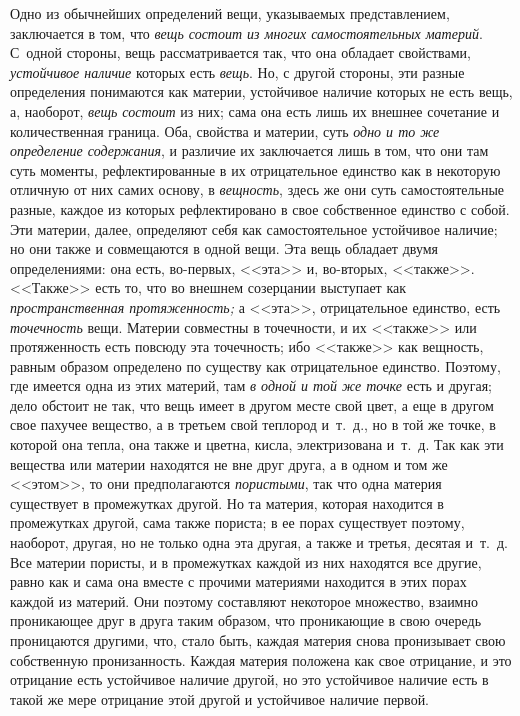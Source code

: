 Одно из обычнейших определений вещи, указываемых представлением, заключается
в том, что {\em вещь состоит из многих самостоятельных
материй}. С~одной стороны, вещь рассматривается так, что она обладает
свойствами, {\em устойчивое наличие} которых есть
{\em вещь}. Но, с другой стороны, эти разные
определения понимаются как материи, устойчивое наличие которых не есть
вещь, а, наоборот, {\em вещь состоит} из них; сама она
есть лишь их внешнее сочетание и количественная граница. Оба, свойства и
материи, суть {\em одно и то же определение
содержания}, и различие их заключается лишь в том, что они там суть
моменты, рефлектированные в их отрицательное единство как в некоторую
отличную от них самих основу, в {\em вещность}, здесь
же они суть самостоятельные разные, каждое из которых рефлектировано в свое
собственное единство с собой. Эти материи, далее, определяют себя как
самостоятельное устойчивое наличие; но они также и совмещаются в одной
вещи. Эта вещь обладает двумя определениями: она есть, во-первых, <<эта>> и,
во-вторых, <<также>>. <<Также>> есть то, что во внешнем созерцании выступает
как {\em пространственная протяженность;} а <<эта>>,
отрицательное единство, есть {\em точечность} вещи.
Материи совместны в точечности, и их <<также>> или протяженность есть повсюду
эта точечность; ибо <<также>> как вещность, равным образом определено по
существу как отрицательное единство. Поэтому, где имеется одна из этих
материй, там {\em в одной и той же точке} есть и
другая; дело обстоит не так, что вещь имеет в другом месте свой цвет, а еще
в другом свое пахучее вещество, а в третьем свой теплород и~т.~д., но в той
же точке, в которой она тепла, она также и цветна, кисла, электризована
и~т.~д. Так как эти вещества или материи находятся не вне друг друга, а в
одном и том же <<этом>>, то они предполагаются
{\em пористыми}, так что одна материя существует в
промежутках другой. Но та материя, которая находится в промежутках другой,
сама также пориста; в ее порах существует поэтому, наоборот, другая, но не
только одна эта другая, а также и третья, десятая и~т.~д. Все материи
пористы, и в промежутках каждой из них находятся все другие, равно как и
сама она вместе с прочими материями находится в этих порах каждой из
материй. Они поэтому составляют некоторое множество, взаимно проникающее
друг в друга таким образом, что проникающие в свою очередь проницаются
другими, что, стало быть, каждая материя снова пронизывает свою собственную
пронизанность. Каждая материя положена как свое отрицание, и это отрицание
есть устойчивое наличие другой, но это устойчивое наличие есть в такой же
мере отрицание этой другой и устойчивое наличие первой.

